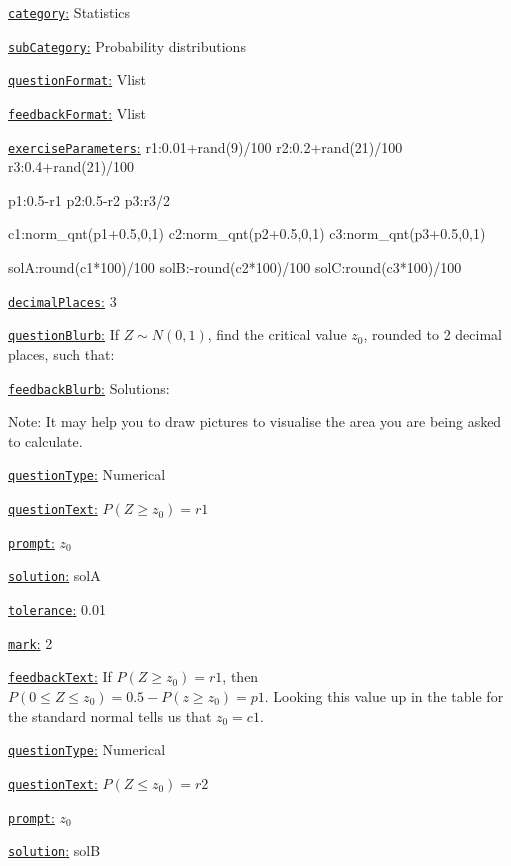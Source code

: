 \documentclass[preview]{standalone}
\newcommand \fieldname[1]{\underline{\texttt{#1}:}}
\begin{document}
\fieldname{category}  %
Statistics

\fieldname{subCategory} %
Probability distributions

\fieldname{questionFormat}
Vlist

\fieldname{feedbackFormat}
Vlist

\fieldname{exerciseParameters}
r1:0.01+rand(9)/100
r2:0.2+rand(21)/100
r3:0.4+rand(21)/100

p1:0.5-r1
p2:0.5-r2
p3:r3/2

c1:norm_qnt(p1+0.5,0,1)
c2:norm_qnt(p2+0.5,0,1)
c3:norm_qnt(p3+0.5,0,1)

solA:round(c1*100)/100
solB:-round(c2*100)/100
solC:round(c3*100)/100

\fieldname{decimalPlaces}
3

\fieldname{questionBlurb}
If $Z \sim N(0,1)$, find the critical value $z_0$, rounded to 2 decimal places, such that:

\fieldname{feedbackBlurb}
Solutions:

Note: It may help you to draw pictures to visualise the area you are being asked to calculate.

\fieldname{questionType}
Numerical

\fieldname{questionText}
$P(Z \ge z_0) = {r1}$

\fieldname{prompt}
$z_0$

\fieldname{solution}
solA

\fieldname{tolerance}
0.01

\fieldname{mark}
2

\fieldname{feedbackText}
If $P(Z \ge z_0) = {r1}$, then $P(0 \le Z \le z_0)  = 0.5 - P(z \ge z_0) = {p1}$. Looking this value up in the table for the standard normal tells us that $z_0 = {c1}$.

\fieldname{questionType}
Numerical

\fieldname{questionText}
$P(Z \le z_0) = {r2}$

\fieldname{prompt}
$z_0$

\fieldname{solution}
solB
\end{document}
